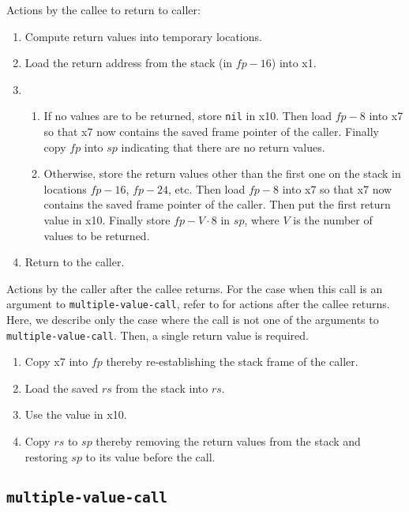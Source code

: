 Actions by the callee to return to caller:

\begin{enumerate}
\item Compute return values into temporary locations.
\item Load the return address from the stack (in $fp - 16$) into x1.
\item
  \begin{enumerate}
  \item If no values are to be returned, store \texttt{nil} in x10.
    Then load $fp - 8$ into x7 so that x7 now contains the saved frame
    pointer of the caller.  Finally copy $fp$ into $sp$ indicating
    that there are no return values.
  \item Otherwise, store the return values other than the first one on
    the stack in locations $fp - 16$, $fp - 24$, etc.  Then load $fp -
    8$ into x7 so that x7 now contains the saved frame pointer of the
    caller.  Then put the first return value in x10.  Finally store
    $fp - V \cdot 8$ in $sp$, where $V$ is the number of values to be
    returned.
  \end{enumerate}
\item Return to the caller.
\end{enumerate}

Actions by the caller after the callee returns.  For the case when
this call is an argument to \texttt{multiple-value-call}, refer to
 for actions after the
callee returns.  Here, we describe only the case where the call is not
one of the arguments to \texttt{multiple-value-call}.  Then, a single
return value is required.

\begin{enumerate}
\item Copy x7 into $fp$ thereby re-establishing the stack frame of the
  caller.
\item Load the saved $rs$ from the stack into $rs$.
\item Use the value in x10.
\item Copy $rs$ to $sp$ thereby removing the return values from the
  stack and restoring $sp$ to its value before the call.
\end{enumerate}

\subsection{\texttt{multiple-value-call}}

